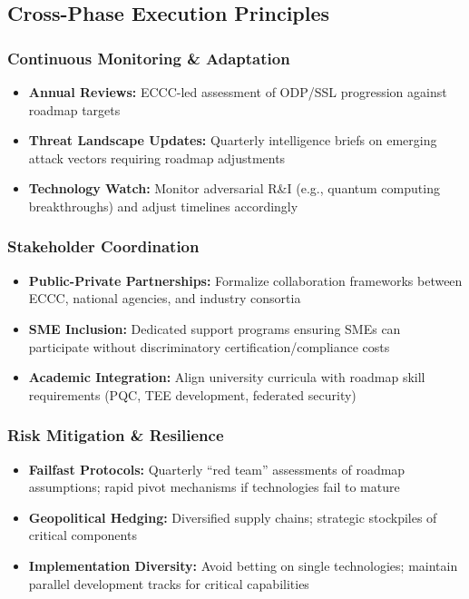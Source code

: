 \documentclass[12pt,a4paper]{article}
\begin{document}
\subsection*{Cross-Phase Execution Principles}

\subsubsection*{Continuous Monitoring \& Adaptation}
\begin{itemize}
    \item \textbf{Annual Reviews:} ECCC-led assessment of ODP/SSL progression against roadmap targets
    \item \textbf{Threat Landscape Updates:} Quarterly intelligence briefs on emerging attack vectors requiring roadmap adjustments
    \item \textbf{Technology Watch:} Monitor adversarial R\&I (e.g., quantum computing breakthroughs) and adjust timelines accordingly
\end{itemize}

\subsubsection*{Stakeholder Coordination}
\begin{itemize}
    \item \textbf{Public-Private Partnerships:} Formalize collaboration frameworks between ECCC, national agencies, and industry consortia
    \item \textbf{SME Inclusion:} Dedicated support programs ensuring SMEs can participate without discriminatory certification/compliance costs
    \item \textbf{Academic Integration:} Align university curricula with roadmap skill requirements (PQC, TEE development, federated security)
\end{itemize}

\subsubsection*{Risk Mitigation \& Resilience}
\begin{itemize}
    \item \textbf{Failfast Protocols:} Quarterly ``red team'' assessments of roadmap assumptions; rapid pivot mechanisms if technologies fail to mature
    \item \textbf{Geopolitical Hedging:} Diversified supply chains; strategic stockpiles of critical components
    \item \textbf{Implementation Diversity:} Avoid betting on single technologies; maintain parallel development tracks for critical capabilities
\end{itemize}
\end{document}
